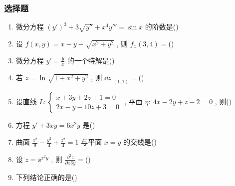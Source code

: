 \subsubsection{选择题}
\begin{enumerate}
	\item 微分方程 $(y')^3+3\sqrt{y''}+x^4y'''=\sin x$ 的阶数是(\hspace{1pc})
	\item 设 $f(x,y)=x-y-\sqrt{x^2+y^2}$ , 则 $f_{x}(3,4)=$(\hspace{1pc})
	\item 微分方程 $y'=\frac{y}{x}$ 的一个特解是(\hspace{1pc})
	\item 若 $z=\ln\sqrt{1+x^2+y^2}$ , 则 $\left.\dd z\right|_{(1,1)}=$(\hspace{1pc})
	\item 设直线 $L:\begin{cases}
	x+3y+2z+1=0\\
	2x-y-10z+3=0
	\end{cases}$ , 平面 $\eta:\ 4x-2y+z-2=0$ , 则(\hspace{1pc})
	\item 方程 $y'+3xy=6x^2y$ 是(\hspace{1pc})
	\item 曲面 $\frac{x^2}{9}-\frac{y^2}{4}+\frac{z^2}{4}=1$ 与平面 $x=y$ 的交线是(\hspace{1pc})
	\item 设 $z=\ee^{x^2y}$ , 则 $\frac{\partial^2z}{\partial x\partial y}=$(\hspace{1pc})
	\item 下列结论正确的是(\hspace{1pc})
\end{enumerate}

